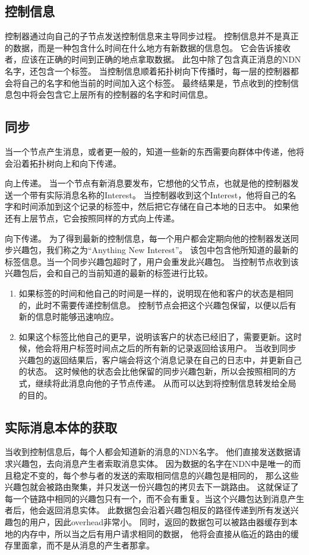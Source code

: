 \subsection{控制信息}
控制器通过向自己的子节点发送控制信息来主导同步过程。
控制信息并不是真正的数据，而是一种包含什么时间在什么地方有新数据的信息包。
它会告诉接收者，应该在正确的时间到正确的地点拿取数据。
此包中除了包含真正消息的NDN名字，还包含一个标签。
当控制信息顺着拓扑树向下传播时，每一层的控制器都会将自己的名字和他当前的时间加入这个标签。
最终结果是，节点收到的控制信息包中将会包含它上层所有的控制器的名字和时间信息。

\subsection{同步}

当一个节点产生消息，或者更一般的，知道一些新的东西需要向群体中传递，他将会沿着拓扑树向上和向下传递。

向上传递。
当一个节点有新消息要发布，它想他的父节点，也就是他的控制器发送一个带有实际消息名称的Interest。
当控制器收到这个Interest，他将自己的名字和时间添加到这个记录的标签中，然后把它存储在自己本地的日志中。
如果他还有上层节点，它会按照同样的方式向上传递。

向下传递。
为了得到最新的控制信息，每一个用户都会定期向他的控制器发送同步兴趣包，我们称之为“Anything New Interest”。
该包中包含他所知道的最新的标签信息。当一个同步兴趣包超时了，用户会重发此兴趣包。
当控制节点收到该兴趣包后，会和自己的当前知道的最新的标签进行比较。
\begin{enumerate}
  \item 如果标签的时间和他自己的时间是一样的，说明现在他和客户的状态是相同的，此时不需要传递控制信息。
  控制节点会把这个兴趣包保留，以便以后有新的信息时能够迅速响应。
  \item 如果这个标签比他自己的更早，说明该客户的状态已经旧了，需要更新。这时候，他会将用户标签时间点之后的所有新的记录返回给该用户。
  当收到同步兴趣包的返回结果后，客户端会将这个消息记录在自己的日志中，并更新自己的状态。
  这时候他的状态会比他保留的同步兴趣包新，所以会按照相同的方式，继续将此消息向他的子节点传递。
  从而可以达到将控制信息转发给全局的目的。
\end{enumerate}

\subsection{实际消息本体的获取}

当收到控制信息后，每个人都会知道新的消息的NDN名字。
他们直接发送数据请求兴趣包，去向消息产生者索取消息实体。
因为数据的名字在NDN中是唯一的而且稳定不变的，每个参与者的发送的索取相同信息的兴趣包是相同的，
那么这些兴趣包就会被路由聚集，并只发送一份兴趣包的拷贝去下一跳路由。
这就保证了每一个链路中相同的兴趣包只有一个，而不会有重复。当这个兴趣包达到消息产生者后，他会返回消息实体。
此数据包会沿着兴趣包相反的路径传递到所有发送兴趣包的用户，因此overhead非常小。
同时，返回的数据包可以被路由器缓存到本地的内存中，所以当之后有用户请求相同的数据，
他将会直接从临近的路由的缓存里面拿，而不是从消息的产生者那拿。




